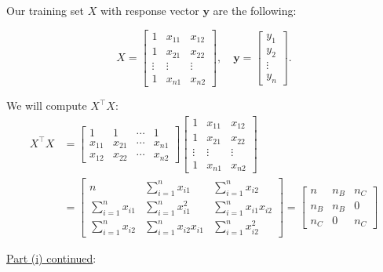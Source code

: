 \documentclass[12pt]{article}
\newcommand{\snmath}{\displaystyle\sum_{i=1}^n}
\newcommand{\nb}{n_B}
\newcommand{\nc}{n_C}
\begin{document}
\begin{enumerate}
\begin{tcolorbox}[colback=white, sharp corners]
Our training set $X$ with response vector $\mathbf{y}$ are the following: 

\[
	X = \begin{bmatrix} 1 & x_{11} & x_{12}\\
	1 & x_{21} & x_{22} \\ 
	\vdots & \vdots & \vdots \\
	1 & x_{n1} & x_{n2} \end{bmatrix}, \quad \mathbf{y} = \begin{bmatrix} y_1 \\ y_2 \\ \vdots \\ y_n \end{bmatrix}.
\]

We will compute $X^\top X$:
\begin{align*}
	X^\top X &= \begin{bmatrix} 1 & 1 & \cdots & 1 \\ 
	x_{11} & x_{21} & \cdots & x_{n1} \\ x_{12} & x_{22} & \cdots & x_{n2} \end{bmatrix} \begin{bmatrix} 1 & x_{11} & x_{12}\\
	1 & x_{21} & x_{22} \\ 
	\vdots & \vdots & \vdots \\
	1 & x_{n1} & x_{n2} \end{bmatrix} \\
	&= \begin{bmatrix} n & \snmath x_{i1} & \snmath x_{i2} \\
	\snmath x_{i1} & \snmath x_{i1}^2 & \snmath x_{i1} x_{i2} \\
	\snmath x_{i2} & \snmath x_{i2} x_{i1} & \snmath x_{i2}^2
	\end{bmatrix} = \begin{bmatrix} n & \nb & \nc \\
	\nb & \nb & 0 \\
	\nc & 0 & \nc \end{bmatrix}
\end{align*}


\end{tcolorbox}

\newpage

\begin{tcolorbox}[colback = white, sharp corners]

\underline{Part (i) continued}: 

\vspace{2mm}


\end{tcolorbox}
\end{enumerate}
\end{document}
